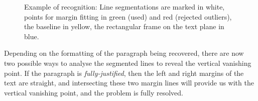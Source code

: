 \begin{figure}[t]
\centering
\begin{center}
\hspace{2mm}
\end{center}
\vspace*{0mm}
\caption{Example of recognition: 
Line segmentations are marked in white, points for margin fitting in green
(used) and red (rejected outliers), the baseline in yellow,
the rectangular frame on the text plane in blue.}
\label{linesegfig}
\label{summaryfig}
\end{figure}



Depending on the formatting of the paragraph being recovered, there are now two
possible ways to analyse the segmented lines to reveal the vertical vanishing
point.  If the paragraph is {\em fully-justified}, then the left and right
margins of the text are straight, and intersecting these two margin lines will
provide us with the vertical vanishing point, and the problem is fully resolved.

